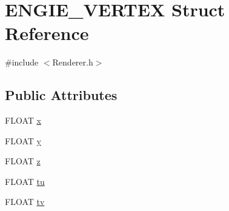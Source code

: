 \hypertarget{struct_e_n_g_i_e___v_e_r_t_e_x}{\section{E\-N\-G\-I\-E\-\_\-\-V\-E\-R\-T\-E\-X Struct Reference}
\label{struct_e_n_g_i_e___v_e_r_t_e_x}
}


{\ttfamily \#include $<$Renderer.\-h$>$}

\subsection*{Public Attributes}
\begin{DoxyCompactItemize}
\item 
F\-L\-O\-A\-T \hyperlink{struct_e_n_g_i_e___v_e_r_t_e_x_a435c2dc7562a197f2ff00e6f5887574e}{x}
\item 
F\-L\-O\-A\-T \hyperlink{struct_e_n_g_i_e___v_e_r_t_e_x_adeabf084e472c7f64cc0d9250f1f6470}{y}
\item 
F\-L\-O\-A\-T \hyperlink{struct_e_n_g_i_e___v_e_r_t_e_x_a0847bb638d2734565a9cad5c268afe82}{z}
\item 
F\-L\-O\-A\-T \hyperlink{struct_e_n_g_i_e___v_e_r_t_e_x_a789127a0b4667146a91eb57c2ad1994f}{tu}
\item 
F\-L\-O\-A\-T \hyperlink{struct_e_n_g_i_e___v_e_r_t_e_x_a3d918e05f43017a1bdd3af89391afe3e}{tv}
\end{DoxyCompactItemize}


